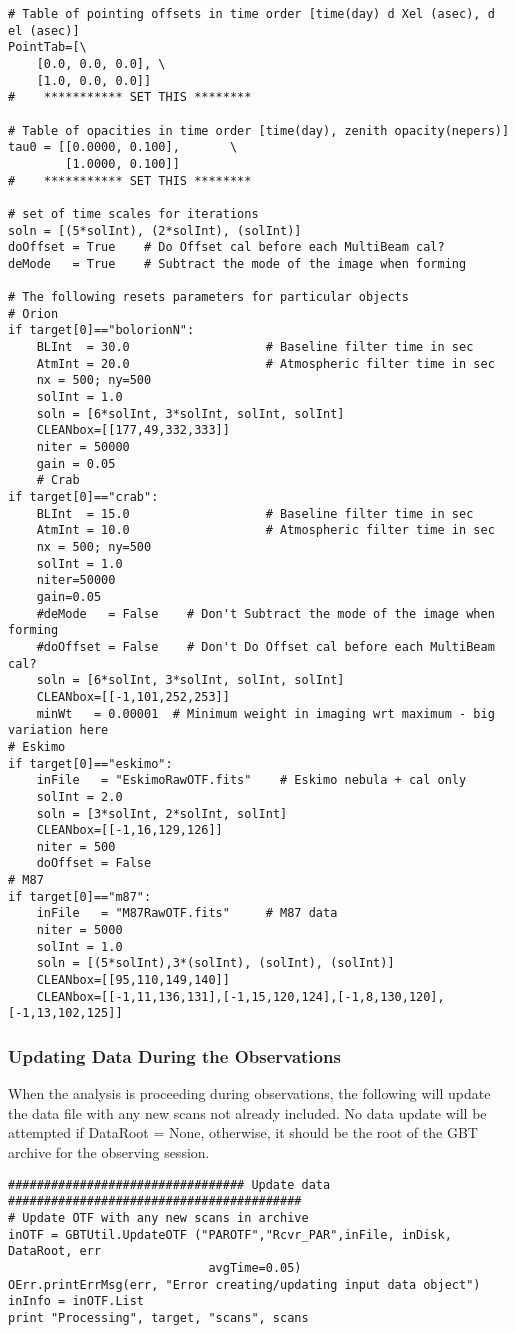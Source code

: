 \documentclass[11pt]{report}
\begin{document}
\begin{verbatim}
# Table of pointing offsets in time order [time(day) d Xel (asec), d el (asec)]
PointTab=[\
    [0.0, 0.0, 0.0], \
    [1.0, 0.0, 0.0]]
#    *********** SET THIS ********

# Table of opacities in time order [time(day), zenith opacity(nepers)]
tau0 = [[0.0000, 0.100],       \
        [1.0000, 0.100]]
#    *********** SET THIS ********

# set of time scales for iterations
soln = [(5*solInt), (2*solInt), (solInt)]
doOffset = True    # Do Offset cal before each MultiBeam cal?
deMode   = True    # Subtract the mode of the image when forming

# The following resets parameters for particular objects
# Orion 
if target[0]=="bolorionN":
    BLInt  = 30.0                   # Baseline filter time in sec
    AtmInt = 20.0                   # Atmospheric filter time in sec
    nx = 500; ny=500
    solInt = 1.0
    soln = [6*solInt, 3*solInt, solInt, solInt]
    CLEANbox=[[177,49,332,333]]
    niter = 50000
    gain = 0.05
    # Crab 
if target[0]=="crab":
    BLInt  = 15.0                   # Baseline filter time in sec
    AtmInt = 10.0                   # Atmospheric filter time in sec
    nx = 500; ny=500
    solInt = 1.0
    niter=50000
    gain=0.05
    #deMode   = False    # Don't Subtract the mode of the image when forming
    #doOffset = False    # Don't Do Offset cal before each MultiBeam cal?
    soln = [6*solInt, 3*solInt, solInt, solInt]
    CLEANbox=[[-1,101,252,253]]
    minWt   = 0.00001  # Minimum weight in imaging wrt maximum - big variation here
# Eskimo
if target[0]=="eskimo":
    inFile   = "EskimoRawOTF.fits"    # Eskimo nebula + cal only
    solInt = 2.0
    soln = [3*solInt, 2*solInt, solInt]
    CLEANbox=[[-1,16,129,126]]
    niter = 500
    doOffset = False
# M87
if target[0]=="m87":
    inFile   = "M87RawOTF.fits"     # M87 data
    niter = 5000
    solInt = 1.0
    soln = [(5*solInt),3*(solInt), (solInt), (solInt)]
    CLEANbox=[[95,110,149,140]]
    CLEANbox=[[-1,11,136,131],[-1,15,120,124],[-1,8,130,120],[-1,13,102,125]]

\end{verbatim}

\subsubsection{Updating Data During the Observations}
When the analysis is proceeding during observations, the following
will update the data file with any new scans not already included.
No data update will be attempted if DataRoot = None, otherwise, it
should be the root of the GBT archive for the observing session.
\begin{verbatim}
################################# Update data #########################################
# Update OTF with any new scans in archive
inOTF = GBTUtil.UpdateOTF ("PAROTF","Rcvr_PAR",inFile, inDisk, DataRoot, err
                            avgTime=0.05)
OErr.printErrMsg(err, "Error creating/updating input data object")
inInfo = inOTF.List
print "Processing", target, "scans", scans

\end{verbatim}
\end{document}
